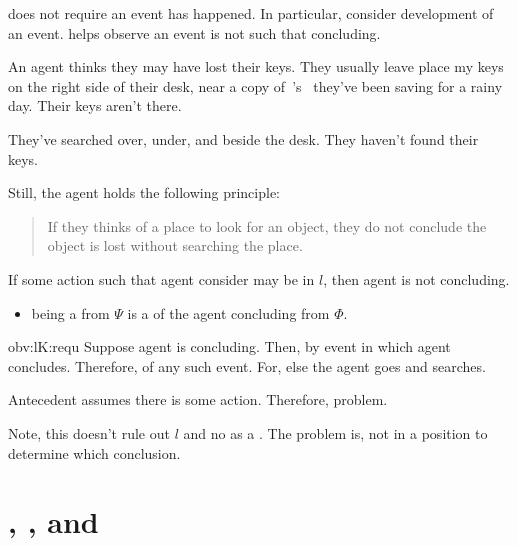 \begin{note}
  \requ{} does not require an event has happened.
  In particular, consider development of an event.
  \requ{} helps observe an event is not such that concluding.

  \begin{scenario}%
    \label{illu:lost-key}%
    An agent thinks they may have lost their keys.
    They usually leave place my keys on the right side of their desk, near a copy of~\citeauthor{Vickers:1989tr}'s~ they've been saving for a rainy day.
    Their keys aren't there.

    They've searched over, under, and beside the desk.
    They haven't found their keys.

    Still, the agent holds the following principle:
    \begin{quote}
      If they thinks of a place to look for an object, they do not conclude the object is lost without searching the place.
    \end{quote}
  \end{scenario}

  \begin{observation}
    \label{obv:lK:requ}
    If some action such that agent consider may be in  \(l\), then agent is not concluding.
  \end{observation}

  {
    \color{red}
  \begin{itemize}
  \item
     being a \fc{} from \(\Psi\) is a \requ{} of the agent concluding  from \(\Phi\).
  \end{itemize}
  }

  \begin{motivation}{obv:lK:requ}
    Suppose agent is concluding.
    Then, by \assuPP{} event in which agent concludes.
    Therefore, \requ{} of any such event.
    For, else the agent goes and searches.

    Antecedent assumes there is some action.
    Therefore, problem.
  \end{motivation}

  Note, this doesn't rule out \(l\) and no as a \fc{}.
  The problem is, not in a position to determine which conclusion.
\end{note}

\section{, \qWhyV{}, and \issueConstraint{}}
\label{sec:comining-ingredients}

